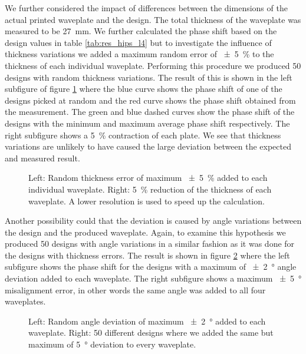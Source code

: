 We further considered the impact of differences between the dimensions of the actual printed waveplate and the design. The total thickness of the waveplate was measured to be \SI{27}{\milli \meter}. We further calculated the phase shift based on the design values in table \ref{tab:res_hips_l4} but to investigate the influence of thickness variations we added a maximum random error of \SI{\pm 5}{\percent} to the thickness of each individual waveplate. Performing this procedure we produced 50 designs with random thickness variations. The result of this is shown in the left subfigure of figure \ref{fig:delta_width_err} where the blue curve shows the phase shift of one of the designs picked at random and the red curve shows the phase shift obtained from the measurement. The green and blue dashed curves show the phase shift of the designs with the minimum and  maximum  average  phase shift respectively. The right subfigure shows a \SI{5}{\percent} contraction of each plate. We see that thickness variations are unlikely to have caused the large deviation between the expected and measured result.

\begin{figure}[H]
    \centering
    
    \caption{Left: Random thickness error of maximum \SI{\pm 5}{\percent} added to each individual waveplate. Right: \SI{5}{\percent} reduction of the thickness of each waveplate. A lower resolution is used to speed up the calculation.}
    \label{fig:delta_width_err}
\end{figure}

Another possibility could that the deviation is caused by angle variations between the design and the produced waveplate. Again, to examine this hypothesis we produced 50 designs with angle variations in a similar fashion as it was done for the designs with thickness errors. The result is shown in figure \ref{fig:delta_angle_err} where the left subfigure shows the phase shift for the designs with a maximum of \SI{\pm2}{\degree} angle deviation added to each waveplate. The right subfigure shows a maximum \SI{\pm5}{\degree} misalignment error, in other words the same angle was added to all four waveplates. 

\begin{figure}[H]
    \centering
    
    \caption{Left: Random angle deviation of maximum \SI{\pm2}{\degree} added to each waveplate. Right: 50 different designs where we added the same but maximum of \SI{5}{\degree} deviation to every waveplate.}
    \label{fig:delta_angle_err}
\end{figure}


